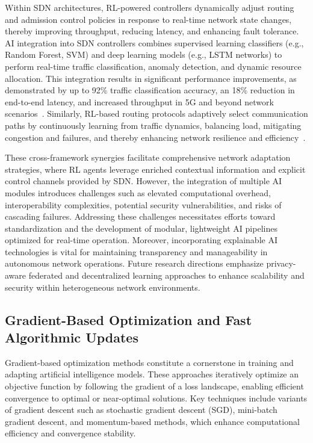\documentclass[sigconf]{acmart}
\begin{document}
Within SDN architectures, RL-powered controllers dynamically adjust routing and admission control policies in response to real-time network state changes, thereby improving throughput, reducing latency, and enhancing fault tolerance. AI integration into SDN controllers combines supervised learning classifiers (e.g., Random Forest, SVM) and deep learning models (e.g., LSTM networks) to perform real-time traffic classification, anomaly detection, and dynamic resource allocation. This integration results in significant performance improvements, as demonstrated by up to 92\% traffic classification accuracy, an 18\% reduction in end-to-end latency, and increased throughput in 5G and beyond network scenarios~\cite{ref52}. Similarly, RL-based routing protocols adaptively select communication paths by continuously learning from traffic dynamics, balancing load, mitigating congestion and failures, and thereby enhancing network resilience and efficiency~\cite{ref53}.

These cross-framework synergies facilitate comprehensive network adaptation strategies, where RL agents leverage enriched contextual information and explicit control channels provided by SDN. However, the integration of multiple AI modules introduces challenges such as elevated computational overhead, interoperability complexities, potential security vulnerabilities, and risks of cascading failures. Addressing these challenges necessitates efforts toward standardization and the development of modular, lightweight AI pipelines optimized for real-time operation. Moreover, incorporating explainable AI technologies is vital for maintaining transparency and manageability in autonomous network operations. Future research directions emphasize privacy-aware federated and decentralized learning approaches to enhance scalability and security within heterogeneous network environments.

\subsection{Gradient-Based Optimization and Fast Algorithmic Updates}
Gradient-based optimization methods constitute a cornerstone in training and adapting artificial intelligence models. These approaches iteratively optimize an objective function by following the gradient of a loss landscape, enabling efficient convergence to optimal or near-optimal solutions. Key techniques include variants of gradient descent such as stochastic gradient descent (SGD), mini-batch gradient descent, and momentum-based methods, which enhance computational efficiency and convergence stability.
\end{document}
